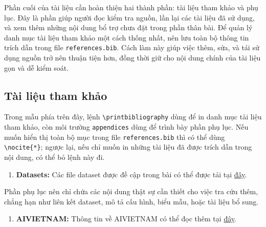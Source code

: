 \documentclass[12pt]{ai_conquer2026}
\begin{document}
Phần cuối của tài liệu cần hoàn thiện hai thành phần: tài liệu tham khảo và phụ lục. Đây là phần giúp người đọc kiểm tra nguồn, lần lại các tài liệu đã sử dụng, và xem thêm những nội dung bổ trợ chưa đặt trong phần thân bài. Để quản lý danh mục tài liệu tham khảo một cách thống nhất, nên lưu toàn bộ thông tin trích dẫn trong file \texttt{references.bib}. Cách làm này giúp việc thêm, sửa, và tái sử dụng nguồn trở nên thuận tiện hơn, đồng thời giữ cho nội dung chính của tài liệu gọn và dễ kiểm soát.

\begin{aivnoutputbox}[]
\section{Tài liệu tham khảo}
\nocite{*}
\printbibliography
\end{aivnoutputbox}

Trong mẫu phía trên đây, lệnh \verb|\printbibliography| dùng để in danh mục tài liệu tham khảo, còn môi trường \verb|appendices| dùng để trình bày phần phụ lục. Nếu muốn hiển thị toàn bộ mục trong file \texttt{references.bib} thì có thể dùng \verb|\nocite{*}|; ngược lại, nếu chỉ muốn in những tài liệu đã được trích dẫn trong nội dung, có thể bỏ lệnh này đi. 

\begin{aivnoutputbox}
\begin{appendices}
\begin{enumerate}
    \item \textbf{Datasets:} Các file dataset được đề cập trong bài có thể được tải tại \href{https://aivietnam.edu.vn/}{đây}.
\end{enumerate}
\end{appendices}
\end{aivnoutputbox}

Phần phụ lục nên chỉ chứa các nội dung thật sự cần thiết cho việc tra cứu thêm, chẳng hạn như liên kết dataset, mô tả cấu hình, biểu mẫu, hoặc tài liệu bổ sung.

\begin{aivnoutputbox}
\begin{appendices}
\begin{enumerate}
    \item \textbf{AIVIETNAM:} Thông tin về AIVIETNAM có thể đọc thêm tại \href{https://aivietnam.edu.vn/}{đây}.
\end{enumerate}
\end{appendices}
\end{aivnoutputbox}
\end{document}

